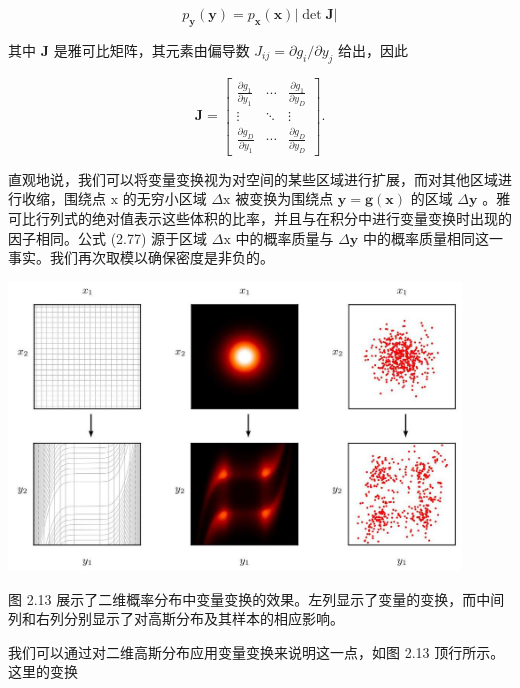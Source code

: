 \documentclass[10pt]{report}
\begin{document}
\[
{p}_{\mathbf{y}}\left( \mathbf{y}\right)  = {p}_{\mathbf{x}}\left( \mathbf{x}\right) \left| {\det \mathbf{J}}\right|  \tag{2.76}
\]

其中 \(\mathbf{J}\) 是雅可比矩阵，其元素由偏导数 \({J}_{ij} = \partial {g}_{i}/\partial {y}_{j}\) 给出，因此

\[
\mathbf{J} = \left\lbrack  \begin{matrix} \frac{\partial {g}_{1}}{\partial {y}_{1}} & \cdots & \frac{\partial {g}_{1}}{\partial {y}_{D}} \\  \vdots &  \ddots  & \vdots \\  \frac{\partial {g}_{D}}{\partial {y}_{1}} & \cdots & \frac{\partial {g}_{D}}{\partial {y}_{D}} \end{matrix}\right\rbrack  . \tag{2.77}
\]

直观地说，我们可以将变量变换视为对空间的某些区域进行扩展，而对其他区域进行收缩，围绕点 \(\mathrm{x}\) 的无穷小区域 \(\Delta \mathrm{x}\) 被变换为围绕点 \(\mathbf{y} = \mathbf{g}\left( \mathbf{x}\right)\) 的区域 \(\Delta \mathbf{y}\) 。雅可比行列式的绝对值表示这些体积的比率，并且与在积分中进行变量变换时出现的因子相同。公式 (2.77) 源于区域 \(\Delta \mathrm{x}\) 中的概率质量与 \(\Delta \mathbf{y}\) 中的概率质量相同这一事实。我们再次取模以确保密度是非负的。

\begin{center}
\includegraphics[max width=0.9\textwidth]{images/0194e279-9b28-703a-88f4-c3ac21e2010d_64_290_359_1210_772_0.jpg}
\end{center}
\hspace*{3em} 

图 2.13 展示了二维概率分布中变量变换的效果。左列显示了变量的变换，而中间列和右列分别显示了对高斯分布及其样本的相应影响。

我们可以通过对二维高斯分布应用变量变换来说明这一点，如图 2.13 顶行所示。这里的变换
\end{document}
